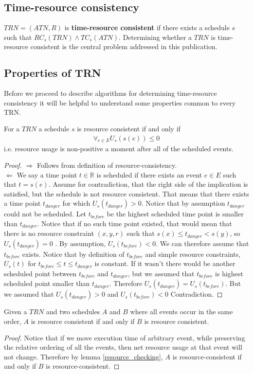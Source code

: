 \subsection{Time-resource consistency}
$TRN=(ATN, R)$ is \textbf{time-resource consistent} if there exists a schedule $s$ such that $RC_s(TRN) \wedge TC_s(ATN)$. Determining whether a $TRN$ is time-resource consistent is the central problem addressed in this publication.

\subsection{Properties of TRN}
Before we proceed to describe algorithms for determining time-resource consistency it will be helpful to understand some properties common to every TRN.
\begin{lemma}
\label{resource_checking}
For a $TRN$ a schedule $s$ is resource consistent if and only if
\begin{align}
\label{eq:resource_consistency} \forall_{e \in E} U_s(s(e)) \leq 0
\end{align}
i.e. resource usage is non-positive a moment after all of the scheduled events.
\end{lemma}
\begin{proof}

$\Rightarrow$ Follows from definition of resource-consistency.\\
$\Leftarrow$ We say a time point $t \in \mathbb{R}$ is scheduled if there exists an event  $e \in E$ such that $t = s(e)$. Assume for contradiction, that the right side of the implication is satisfied, but the schedule is not resource consistent. That means that there exists a time point $t_{danger}$ for which $U_s(t_{danger}) > 0 $. Notice that by assumption $t_{danger}$ could not be scheduled. Let $t_{before}$ be the highest scheduled time point is smaller than $t_{danger}$. Notice that if no such time point existed, that would mean that there is no resource constraint $(x,y,r)$ such that $s(x) \leq t_{danger} < s(y)$, so $U_s(t_{danger})=0$ . By assumption, $U_s(t_{before}) < 0$.  We can therefore assume that $t_{before}$ exists. Notice that by definition of $t_{before}$ and simple resource constraints, $U_s(t)$ for $t_{before} \leq t \leq t_{danger}$ is constant. If it wasn't there would be another scheduled point between $t_{before}$ and $t_{danger}$, but we assumed that $t_{before}$ is highest scheduled point smaller than $t_{danger}$. Therefore $ U_s(t_{danger}) = U_s(t_{before})$. But we assumed that $U_s(t_{danger}) > 0$ and $U_s(t_{before}) < 0 $ Contradiction.
\end{proof}
\begin{corollary}
\label{cor:ordering}
Given a $TRN$ and two schedules $A$ and $B$ where all events occur in the same order, $A$ is resource consistent if and only if $B$ is resource consistent.
\end{corollary}
\begin{proof}
Notice that if we move execution time of arbitrary event, while preserving the relative ordering of all the events, then net resource usage at that event will not change. Therefore by lemma \ref{resource_checking},  $A$ is resource-consistent if and only if $B$ is resource-consistent.
\end{proof}
